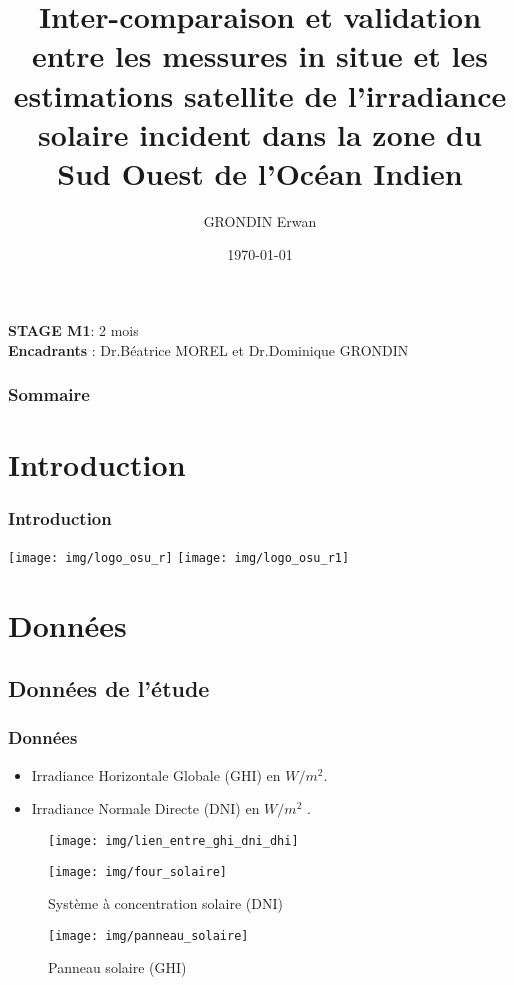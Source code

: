 \documentclass[8pt]{beamer}
\title{Inter-comparaison et validation entre les messures in situe et les estimations satellite de l'irradiance solaire incident dans la zone du Sud Ouest de l'Océan Indien}
\author{GRONDIN Erwan}
\institute{Universié de La Réunion}
\date{\today}
\begin{document}
	

	
\begin{frame}
\textbf{STAGE M1}: 2 mois\\
\textbf{Encadrants} : Dr.Béatrice MOREL et Dr.Dominique GRONDIN
\titlepage
\thispagestyle{empty} %
\end{frame}

\begin{frame}
	\frametitle{Sommaire}
	\tableofcontents[]
	\thispagestyle{empty}
\end{frame}

\section{Introduction}
\begin{frame}
	\frametitle{Introduction}
	\texttt{[image: img/logo\_osu\_r]}
	\texttt{[image: img/logo\_osu\_r1]}
\end{frame}

\section{Données}
\subsection{Données de l'étude}
\begin{frame}
	\frametitle{Données}
	\begin{minipage}[t]{0.48\textwidth}
		\begin{itemize}
			\item Irradiance Horizontale Globale (GHI) en $W/m^2$.
			\item Irradiance Normale Directe (DNI) en $W/m^2$ .
		\end{itemize}
	\end{minipage}
	\hfill
	\begin{minipage}[t]{0.48\textwidth}
		\begin{figure}
			\centering
			\texttt{[image: img/lien\_entre\_ghi\_dni\_dhi]}
		\end{figure}
	\end{minipage}
	\vfill
	\begin{minipage}[t]{0.48\textwidth}
		\begin{figure}
			\centering
			\texttt{[image: img/four\_solaire]}
			\caption{Système à concentration solaire (DNI)}
			\label{fig:foursolaire}
		\end{figure}
		
	\end{minipage}
	\hfill
	\begin{minipage}[t]{0.48\textwidth}
		\begin{figure}
			\centering
			\texttt{[image: img/panneau\_solaire]}
			\caption{Panneau solaire (GHI)}
			\label{fig:Panneausolaire}
		\end{figure}
	\end{minipage}
\end{frame}
\end{document}
